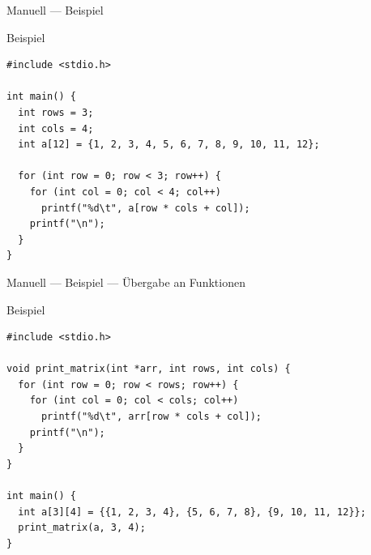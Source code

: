 \documentclass[presentation]{beamer}
\begin{document}
\begin{frame}[label={sec:orgabda218},fragile]{Manuell --- Beispiel}
 \begin{block}{Beispiel}
\begin{verbatim}
#include <stdio.h>

int main() {
  int rows = 3;
  int cols = 4;
  int a[12] = {1, 2, 3, 4, 5, 6, 7, 8, 9, 10, 11, 12};

  for (int row = 0; row < 3; row++) {
    for (int col = 0; col < 4; col++)
      printf("%d\t", a[row * cols + col]);
    printf("\n");
  }
}
\end{verbatim}
\end{block}
\end{frame}
\begin{frame}[label={sec:orgc956e6e},fragile]{Manuell --- Beispiel --- Übergabe an Funktionen}
 \begin{block}{Beispiel}
\begin{verbatim}
#include <stdio.h>

void print_matrix(int *arr, int rows, int cols) {
  for (int row = 0; row < rows; row++) {
    for (int col = 0; col < cols; col++)
      printf("%d\t", arr[row * cols + col]);
    printf("\n");
  }
}

int main() {
  int a[3][4] = {{1, 2, 3, 4}, {5, 6, 7, 8}, {9, 10, 11, 12}};
  print_matrix(a, 3, 4);
}
\end{verbatim}
\end{block}
\end{frame}
\end{document}
